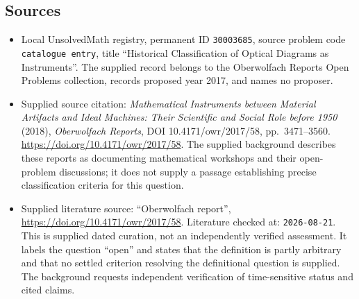 \documentclass[11pt]{article}
\begin{document}
\subsection{Sources}
\begin{itemize}
\item Local UnsolvedMath registry, permanent ID \texttt{30003685}, source problem code \texttt{catalogue entry}, title ``Historical Classification of Optical Diagrams as Instruments''. The supplied record belongs to the Oberwolfach Reports Open Problems collection, records proposed year 2017, and names no proposer.
\item Supplied source citation: \emph{Mathematical Instruments between Material Artifacts and Ideal Machines: Their Scientific and Social Role before 1950} (2018), \emph{Oberwolfach Reports}, DOI 10.4171/owr/2017/58, pp.~3471--3560. \url{https://doi.org/10.4171/owr/2017/58}. The supplied background describes these reports as documenting mathematical workshops and their open-problem discussions; it does not supply a passage establishing precise classification criteria for this question.
\item Supplied literature source: ``Oberwolfach report'', \url{https://doi.org/10.4171/owr/2017/58}. Literature checked at: \texttt{2026-08-21}. This is supplied dated curation, not an independently verified assessment. It labels the question ``open'' and states that the definition is partly arbitrary and that no settled criterion resolving the definitional question is supplied. The background requests independent verification of time-sensitive status and cited claims.
\end{itemize}
\end{document}
